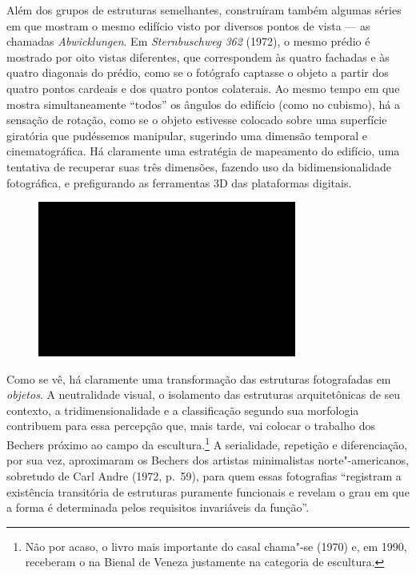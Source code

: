 Além dos grupos de estruturas semelhantes, construíram também algumas
séries em que mostram o mesmo edifício visto por diversos pontos de
vista --- as chamadas \emph{Abwicklungen}. Em \emph{Sternbuschweg 362}
(1972), o mesmo prédio é mostrado por oito vistas diferentes, que
correspondem às quatro fachadas e às quatro diagonais do prédio, como se
o fotógrafo captasse o objeto a partir dos quatro pontos cardeais e dos
quatro pontos colaterais. Ao mesmo tempo em que mostra simultaneamente
``todos'' os ângulos do edifício (como no cubismo), há a sensação de
rotação, como se o objeto estivesse colocado sobre uma superfície
giratória que pudéssemos manipular, sugerindo uma dimensão temporal e
cinematográfica. Há claramente uma estratégia de mapeamento do edifício,
uma tentativa de recuperar suas três dimensões, fazendo uso da
bidimensionalidade fotográfica, e prefigurando as ferramentas 3D das
plataformas digitais.

\begin{figure}[!ht]

\centering
 \includegraphics[width=85mm]{./imgs/im1.jpg}
\caption{\tiny{}}

\end{figure}

Como se vê, há claramente uma transformação das estruturas fotografadas
em \emph{objetos}. A neutralidade visual, o isolamento das estruturas
arquitetônicas de seu contexto, a tridimensionalidade e a classificação
segundo sua morfologia contribuem para essa percepção que, mais tarde,
vai colocar o trabalho dos Bechers próximo ao campo da
escultura.\footnote{Não por acaso, o livro mais importante do casal
  chama"-se {} (1970) e, em 1990, receberam o
  {} na Bienal de Veneza justamente na categoria de
  escultura.} A serialidade, repetição e diferenciação, por sua vez,
aproximaram os Bechers dos artistas minimalistas norte"-americanos,
sobretudo de Carl Andre (1972, p.~59), para quem essas fotografias ``registram a
existência transitória de estruturas puramente funcionais e revelam o
grau em que a forma é determinada pelos requisitos invariáveis da
função''.

